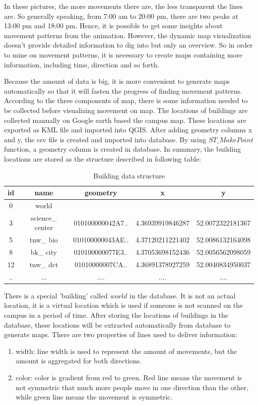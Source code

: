 In these pictures, the more movements there are, the less transparent the lines are. So generally speaking, from 7:00 am to 20:00 pm, there are two peaks at 13:00 pm and 18:00 pm. Hence, it is possible to get some insights about movement patterns from the animation. However, the dynamic map visualization doesn't provide detailed information to dig into but only an overview. So in order to mine on movement patterns, it is necessary to create maps containing more information, including time, direction and so forth. 

Because the amount of data is big, it is more convenient to generate maps automatically so that it will fasten the progress of finding movement patterns. According to the three components of map, there is some information needed to be collected before visualizing movement on map. The locations of buildings are collected manually on Google earth based the campus map. These locations are exported as KML file and imported into QGIS. After adding geometry columns x and y, the csv file is created and imported into database. By using $ST\_MakePoint$ function, a geometry column is created in database. In summary, the building locations are stored as the structure described in following table:

\begin{table}[H]
\centering
\begin{tabular}{|c|c|c|c|c|}
\hline 
id & name & geometry & x & y \\
\hline
0 & world & & & \\
\hline
3 & science\_ center & 010100000042A7.. & 4.36939919846287 & 52.0072322181367 \\
\hline
5 & tnw\_ bio & 010100000043AE.. & 4.37120211221402 & 52.0086132164098 \\
\hline
8 & bk\_ city & 010100000077E3.. & 4.37053698152436 & 52.0056562098059 \\
\hline
12 & tnw\_ dct & 01010000007CA.. & 4.36891378927259 & 52.0040834950037\\
\hline
.. & ... & ....& .... &....\\
\hline	
\end{tabular}
\captionsetup{justification=centering}
\caption{Building data structure}
\label{table:1}
\end{table}

There is a special 'building' called $world$ in the database. It is not an actual location, it is a virtual location which is used if someone is not scanned on the campus in a period of time. After storing the locations of buildings in the database, these locations will be extracted automatically from database to generate maps. There are two properties of lines used to deliver information:
\begin{enumerate}
\item width: line width is used to represent the amount of movements, but the amount is aggregated for both directions.
\item color: color is gradient from red to green. Red line means the movement is not symmetric that much more people move in one direction than the other, while green line means the movement is symmetric.
\end{enumerate}

